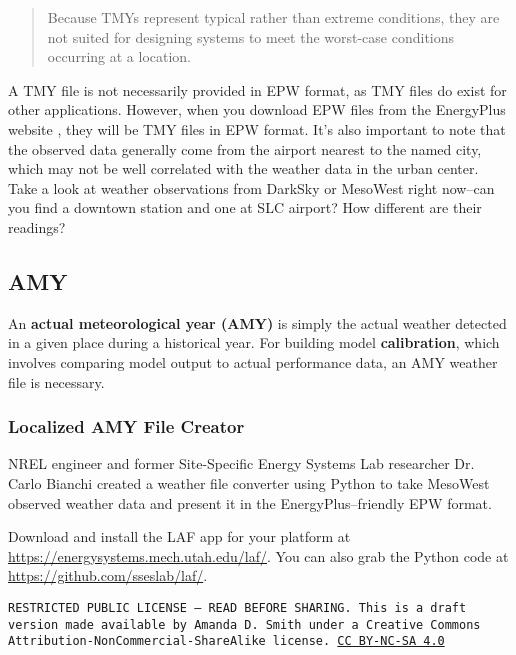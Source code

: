 \documentclass[10pt]{article}
\begin{document}
\begin{quote}
Because TMYs represent typical rather than extreme conditions, they are not suited for designing systems to meet the worst-case conditions occurring at a location. \cite{tmy-nsrdb}
\end{quote}

A TMY file is not necessarily provided in EPW format, as TMY files do exist for other applications. However, when you download EPW files from the EnergyPlus website \cite{EPweather}, they will be TMY files in EPW format. It's also important to note that the observed data generally come from the airport nearest to the named city, which may not be well correlated with the weather data in the urban center. Take a look at weather observations from DarkSky \cite{DarkSky} or MesoWest \cite{MesoWest} right now--can you find a downtown station and one at SLC airport? How different are their readings?

\subsection{AMY}

An \textbf{actual meteorological year (AMY)} is simply the actual weather detected in a given place during a historical year. For building model \textbf{calibration}, which involves comparing model output to actual performance data, an AMY weather file is necessary.

\subsubsection{Localized AMY File Creator}


NREL engineer and former Site-Specific Energy Systems Lab \cite{SSESlab} researcher Dr. Carlo Bianchi \cite{CarloGS} created a weather file converter using Python to take MesoWest \cite{MesoWest} observed weather data and present it in the EnergyPlus--friendly EPW format.

Download and install the LAF app for your platform at \url{https://energysystems.mech.utah.edu/laf/}. You can also grab the Python code at \url{https://github.com/sseslab/laf/}.

\bigskip

\noindent
\texttt{\footnotesize RESTRICTED PUBLIC LICENSE --- READ BEFORE SHARING. This is a draft version made available by Amanda D. Smith under a Creative Commons Attribution-NonCommercial-ShareAlike license. 
\href{https://creativecommons.org/licenses/by-nc-sa/4.0/}{CC BY-NC-SA 4.0}}

\newpage
\printbibliography
\end{document}
